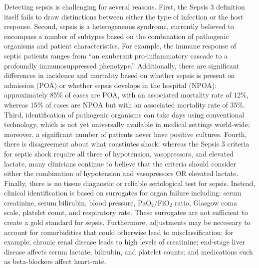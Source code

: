 \documentclass{amia}
\begin{document}
        Detecting sepsis is challenging for several
	reasons.
	 First, the Sepsis 3 definition itself fails to draw
	distinctions between either the type of infection or the
	host response.\cite{coopersmith2018} 
	 Second, sepsis is a heterogeneous syndrome, currently believed to encompass a
	number of subtypes based on the combination of pathogenic
	organisms and patient characteristics.\cite{coopersmith2018}
	 For example, the immune response of septic patients ranges
	from ``an exuberant pro-inflammatory cascade to a profoundly
	immunosuppressed phenotype.''\cite{coopersmith2018}  
	 Additionally, there are significant differences in incidence
	and mortality based on whether sepsis is present on admission
	(POA) or whether sepsis develops in the hospital (NPOA):
	approximately 85\% of cases are POA, with an associated mortality rate
	of 12\%, whereas 15\% of cases are NPOA but with an associated mortality
	rate of 35\%.\cite{rothman2017} 
	 Third, identification of pathogenic organisms
	can take days using conventional technology, which is not yet universally available
        in medical settings world-wide; moreover, 
	a significant number of patients never have positive cultures.\cite{coopersmith2018}  
	 Fourth, there is disagreement about what constiutes shock: whereas
	the Sepsis 3 criteria for septic shock require all three
	of hypotension, vasopressors, and elevated lactate, many
	clinicians continue to believe that the criteria should
	consider either the combination of hypotension and vasopressors
	OR elevated lactate.\cite{coopersmith2018}  
	 Finally, there is no tissue diagnostic or reliable seriological test for
	sepsis.\cite{macdonald2017}  
	 Instead, clinical identification is based on surrogates 
	for organ failure including: serum creatinine, serum bilirubin, 
	blood pressure, PaO$_2$/FiO$_2$ ratio, Glasgow coma scale, platelet count, 
	and respiratory rate.  
	 These surrogates are not sufficient to create a gold
	standard for sepsis.\cite{coopersmith2018}  
	 Furthermore, adjustments may be necessary to account for comorbidities
	that could otherwise lead to misclassification: for example,
	chronic renal disease leads to high levels of creatinine;
	end-stage liver disease affects serum lactate, bilirubin,
	and platelet counts; and medications such as beta-blockers
	affect heart-rate.\cite{manaktala2016}
\end{document}
